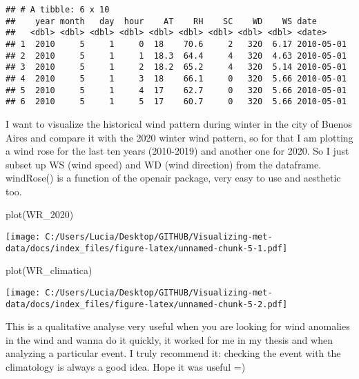 \documentclass[
]{article}
\newenvironment{Shaded}{\begin{snugshade}}{\end{snugshade}}
\newcommand{\AttributeTok}[1]{\textcolor[rgb]{0.77,0.63,0.00}{#1}}
\newcommand{\DecValTok}[1]{\textcolor[rgb]{0.00,0.00,0.81}{#1}}
\newcommand{\FunctionTok}[1]{\textcolor[rgb]{0.00,0.00,0.00}{#1}}
\newcommand{\NormalTok}[1]{#1}
\newcommand{\OtherTok}[1]{\textcolor[rgb]{0.56,0.35,0.01}{#1}}
\newcommand{\SpecialCharTok}[1]{\textcolor[rgb]{0.00,0.00,0.00}{#1}}
\newcommand{\StringTok}[1]{\textcolor[rgb]{0.31,0.60,0.02}{#1}}
\begin{document}
\begin{Shaded}
\end{Shaded}

\begin{verbatim}
## # A tibble: 6 x 10
##    year month   day  hour    AT    RH    SC    WD    WS date      
##   <dbl> <dbl> <dbl> <dbl> <dbl> <dbl> <dbl> <dbl> <dbl> <date>    
## 1  2010     5     1     0  18    70.6     2   320  6.17 2010-05-01
## 2  2010     5     1     1  18.3  64.4     4   320  4.63 2010-05-01
## 3  2010     5     1     2  18.2  65.2     4   320  5.14 2010-05-01
## 4  2010     5     1     3  18    66.1     0   320  5.66 2010-05-01
## 5  2010     5     1     4  17    62.7     0   320  5.66 2010-05-01
## 6  2010     5     1     5  17    60.7     0   320  5.66 2010-05-01
\end{verbatim}

I want to visualize the historical wind pattern during winter in the
city of Buenos Aires and compare it with the 2020 winter wind pattern,
so for that I am plotting a wind rose for the last ten years (2010-2019)
and another one for 2020. So I just subset up WS (wind speed) and WD
(wind direction) from the dataframe. windRose() is a function of the
openair package, very easy to use and aesthetic too.

\begin{Shaded}
\begin{Highlighting}[]
\FunctionTok{plot}\NormalTok{(WR\_2020)}
\end{Highlighting}
\end{Shaded}

\texttt{[image: C:/Users/Lucia/Desktop/GITHUB/Visualizing-met-data/docs/index\_files/figure-latex/unnamed-chunk-5-1.pdf]}

\begin{Shaded}
\begin{Highlighting}[]
\FunctionTok{plot}\NormalTok{(WR\_climatica)}
\end{Highlighting}
\end{Shaded}

\texttt{[image: C:/Users/Lucia/Desktop/GITHUB/Visualizing-met-data/docs/index\_files/figure-latex/unnamed-chunk-5-2.pdf]}

This is a qualitative analyse very useful when you are looking for wind
anomalies in the wind and wanna do it quickly, it worked for me in my
thesis and when analyzing a particular event. I truly recommend it:
checking the event with the climatology is always a good idea. Hope it
was useful =)
\end{document}

